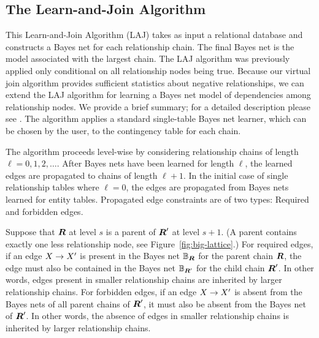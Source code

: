 \documentclass{vldb}
\begin{document}

\subsection{The Learn-and-Join Algorithm} \label{sec:laj}
This Learn-and-Join Algorithm (LAJ)  takes as input a relational database and constructs a Bayes net for each relationship chain. The final Bayes net is the model associated with the largest chain. The LAJ algorithm was previously applied only conditional on all relationship nodes being true. Because our virtual join algorithm provides sufficient statistics about negative relationships, we can extend the LAJ algorithm for learning a Bayes net model of dependencies among relationship nodes. We provide a brief summary; for a detailed description please see \cite{Schulte2011}. The algorithm applies a standard single-table Bayes net learner, which can be chosen by the user, to the contingency table for each chain. 

 The algorithm proceeds level-wise by considering relationship chains of length $\ell = 0,1, 2, \ldots$. After Bayes nets have been learned for length $\ell$, the learned edges are propagated to chains of length $\ell+1$. In the initial case of single relationship tables where $\ell=0$, the edges are propagated from Bayes nets learned for entity tables. Propagated edge constraints are of two types: Required and forbidden edges. 

Suppose that $\boldsymbol{R}$ at level $s$ is a parent of $\boldsymbol{R}'$ at level $s+1$. (A parent contains exactly one less relationship node, see Figure~\ref{fig:big-lattice}.)  For required edges, if an edge $X \rightarrow X'$ is present in the Bayes net $\mathbb{B}_{\boldsymbol{R}}$ for the parent chain $\boldsymbol{R}$, the edge must also be contained in the Bayes net $\mathbb{B}_{\boldsymbol{R}'}$ for the child  chain $\boldsymbol{R}'$. In other words, edges present in smaller relationship chains are inherited by larger relationship chains. For forbidden edges, if an edge $X \rightarrow X'$ is absent from the Bayes nets of all parent chains of $\boldsymbol{R}'$, it must also be absent from the Bayes net of $\boldsymbol{R}'$. In other words, the absence of edges in smaller relationship chains is inherited by larger relationship chains.
\end{document}
